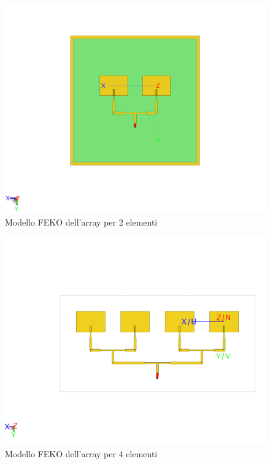 \documentclass[twoside,twocolumn]{article}
\begin{document}
\begin{figure}[h!]
  \includegraphics[width=\linewidth]{Array2E_Cad.png}
  \caption{Modello FEKO dell'array per 2 elementi}
  \label{fig:Array2E_Cad}
\end{figure}
\begin{figure}[h!]
  \includegraphics[width=\linewidth]{Array4E_Cad.png}
  \caption{Modello FEKO dell'array per 4 elementi}
  \label{fig:Array4E_Cad}
\end{figure}
\end{document}
